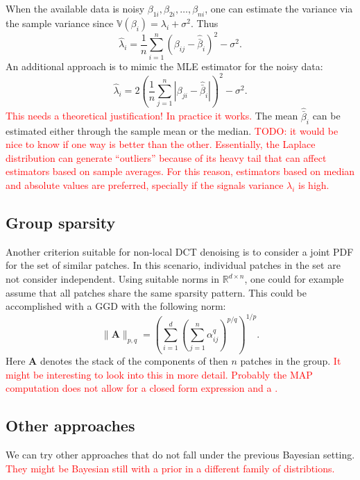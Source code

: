 \documentclass{ipol}
\newcommand{\ma}[1]{\boldsymbol{#1}}
\begin{document}
When the available data is noisy $\beta_{1i},\beta_{2i}, \dots, \beta_{ni}$, one
can estimate the variance via the sample variance since $\mathbb V(\beta_i) =
\lambda_i + \sigma^2$. Thus
\[\hat{\lambda}_i = \frac1n\sum_{i = 1}^n (\beta_{ij} - \hat{\bar \beta}_i)^2 - \sigma^2.\]
An additional approach is to mimic the MLE estimator for the noisy data:
\[\hat \lambda_i = 2\left(\frac1n\sum_{j = 1}^n|\beta_{ji} -
\hat{\bar \beta}_i|\right)^2 - \sigma^2.\]
\textcolor{red}{This needs a theoretical justification! In practice it works.}
The mean $\hat{\bar \beta}_i$ can be estimated either through the sample mean or the
median.
\textcolor{red}{TODO: it would be nice to know if one way is better than the other.
Essentially, the Laplace distribution can generate ``outliers'' because of its heavy tail
that can affect estimators based on sample averages. For this reason,
estimators based on median and absolute values are preferred, specially if the signals variance
$\lambda_i$ is high.}


\subsection{Group sparsity}

Another criterion suitable for non-local DCT denoising is to consider a joint PDF for 
the set of similar patches. In this scenario, individual patches in the set are not 
consider independent. Using suitable norms in $\mathbb R^{d\times n}$, one could for
example assume that all patches share the same sparsity pattern. This could be accomplished
with a GGD with the following norm:
\[\|\ma A\|_{p,q} = 
	\left(\sum_{i = 1}^d\left(\sum_{j = 1}^n \alpha_{ij}^q\right)^{p/q}\right)^{1/p}.
\]
Here $\ma A$ denotes the stack of the components of then $n$ patches in the
group. \textcolor{red}{It might be interesting to look into this in more detail.
Probably the MAP computation does not allow for a closed form expression and
a .}

\subsection{Other approaches}

We can try other approaches that do not fall under the previous Bayesian setting.
\textcolor{red}{They might be Bayesian still with a prior in a different family of
distribtions.} 
\end{document}
